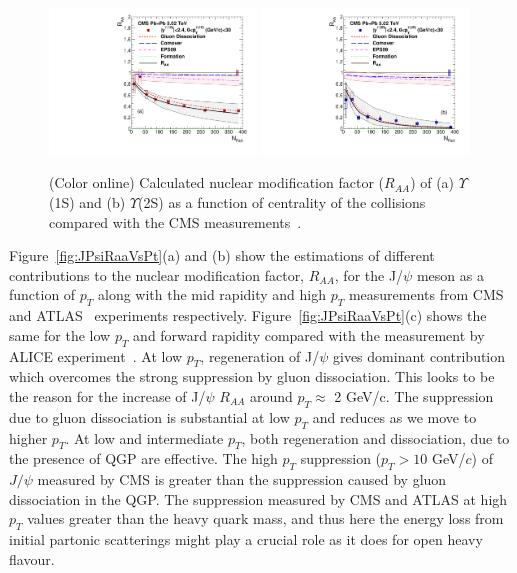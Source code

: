 \documentclass[12pt,a4paper,final]{iopart} %
\newcommand{\Jpsi}{J/\psi}
\begin{document}
\begin{figure}
\includegraphics[width=0.49\textwidth]{Fig9a_CMS_Y1SRAANPart_Shade.pdf}
\includegraphics[width=0.49\textwidth]{Fig9b_CMS_Y2SRAANPart_Shade.pdf}
\caption{(Color online) Calculated nuclear modification factor ($R_{AA}$) of 
  (a) $\Upsilon$(1S) and (b) $\Upsilon$(2S) as a function of centrality of the 
  collisions compared with the CMS measurements~\cite{CMS:2017ucd}.}
\label{fig:UpsilonRaaNPartCMS}
\end{figure}


Figure~\ref{fig:JPsiRaaVsPt}(a) and (b) show the estimations of different contributions
to the nuclear modification factor, $R_{AA}$, for the J/$\psi$ meson as a function of $p_T$ 
along with the mid rapidity and high $p_T$ measurements from
CMS~\cite{Sirunyan:2017isk} and ATLAS~\cite{ATLAS:2016qpn} experiments respectively.
Figure~\ref{fig:JPsiRaaVsPt}(c) shows the same for the low $p_T$ and forward
rapidity compared with the measurement by ALICE experiment~\cite{Adam:2016rdg}.
At low $p_T$, regeneration of J/$\psi$ gives dominant
contribution which overcomes the strong suppression by gluon dissociation.
This looks to be the reason for the increase of J/$\psi$ $R_{AA}$ around $p_T\approx$ 2 GeV/c. 
The suppression due to gluon dissociation is substantial at low $p_T$ and reduces as
we move to higher $p_T$. At low and intermediate $p_T$, both regeneration and dissociation, due
to the presence of QGP are effective.  The high $p_T$
suppression ($p_T > 10$  GeV/$c$) of $\Jpsi$ measured by CMS is greater than the
suppression caused by gluon dissociation in the QGP. The suppression measured
by CMS and ATLAS at high $p_T$ values greater than the heavy quark mass,
and thus here the energy loss from initial partonic scatterings might play a
crucial role as it does for open heavy flavour. 
\end{document}
